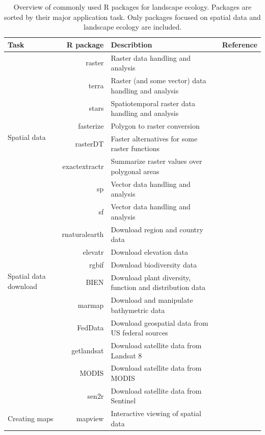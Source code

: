 \documentclass[smallextended]{svjour3}       %
\begin{document}
\begin{table}

\caption{Overview of commonly used R packages for landscape ecology. Packages are sorted by their major application task. Only packages focused on spatial data and landscape ecology are included.}

\begin{tabularx}{450pt}{lrXr}

\hline
Task & R package & Describtion & Reference \\
\hline
\multirow{8}{*}{Spatial data} & raster & Raster data handling and analysis & \cite{Hijmans2019} \\
& terra & Raster (and some vector) data handling and analysis & \cite{R-terra} \\
& stars & Spatiotemporal raster data handling and analysis & \cite{Pebesma2019} \\
& fasterize & Polygon to raster conversion & \cite{Ross2020} \\
& rasterDT & Faster alternatives for some raster functions & \cite{OBrien2020} \\
& exactextractr & Summarize raster values over polygonal areas & \cite{Baston2020} \\
& sp & Vector data handling and analysis & \cite{Pebesma2005,Bivand2013} \\
& sf & Vector data handling and analysis & \cite{Pebesma2018} \\
\hline
\multirow{6}{*}{Spatial data download} & rnaturalearth & Download region and country data & \cite{South2017} \\
& elevatr & Download elevation data & \cite{R-elevatr} \\
& rgbif & Download biodiversity data & \cite{R-rgbif} \\
& BIEN & Download plant diversity, function and distribution data & \cite{Maitner2020} \\
& marmap & Download and manipulate bathymetric data & \cite{Pante2013} \\
& FedData & Download geospatial data from US federal sources & \cite{R-FedData} \\
& getlandsat & Download satellite data from Landsat 8 & \cite{Chamberlain2018} \\
& MODIS & Download satellite data from MODIS & \cite{Mattiuzzi2020} \\
& sen2r & Download satellite data from Sentinel & \cite{R-sen2r} \\
\hline
\multirow{7}{*}{Creating maps} & mapview & Interactive viewing of spatial data & \cite{R-mapview} \\

\end{tabularx}
\end{table}
\end{document}
